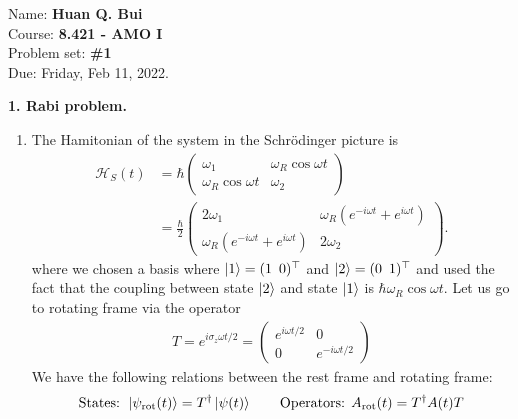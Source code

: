 \documentclass{article}
\theoremstyle{definition}
\newcommand{\ham}{\mathcal{H}}
\newcommand{\f}[2]{\frac{#1}{#2}}
\begin{document}
\begin{framed}
\noindent Name: \textbf{Huan Q. Bui}\\
Course: \textbf{8.421 - AMO I}\\
Problem set: \textbf{\#1}\\
Due: Friday, Feb 11, 2022.
\end{framed}
	
	
\noindent \textbf{1. Rabi problem.}


\begin{enumerate}[label=\alph*)]
	\item The Hamitonian of the system in the Schr\"{o}dinger picture is 
	\begin{align*}
	\ham_S(t) &= \hbar \begin{pmatrix}
	\omega_1 & \omega_R \cos \omega t \\ \omega_R \cos\omega t & \omega_2
	\end{pmatrix} \\
	&= \f{\hbar}{2} \begin{pmatrix}
	2\omega_1 & \omega_R (e^{-i\omega t} + e^{i\omega t}) \\ \omega_R (e^{-i\omega t} + e^{i\omega t}) & 2\omega_2
	\end{pmatrix}.
	\end{align*}
	where we chosen a basis where $\ket{1} = (1 \,\,\, 0)^\top$ and $\ket{2} = (0 \,\,\, 1)^\top$ and used the fact that the coupling between state $\ket{2}$ and state $\ket{1}$ is $\hbar \omega_R \cos\omega t$. Let us go to rotating frame via the operator
	\begin{align*}
	T = e^{i\sigma_z \omega t/2} = \begin{pmatrix}
	e^{i\omega t/2} &  0 \\0  & e^{-i\omega t/2}
	\end{pmatrix} 
	\end{align*}
	We have the following relations between the rest frame and rotating frame:
	\begin{align*}
	\text{States: } \ket{\psi_\text{rot}(t)} = T^\dagger \ket{\psi(t)} \quad\quad \text{Operators: }  A_\text{rot}(t) = T^\dagger A(t) T
	\end{align*}
	

\end{enumerate}
\end{document}
